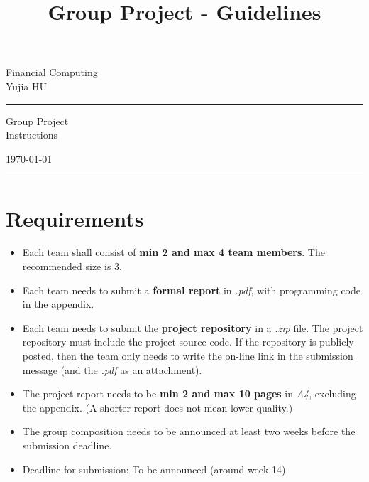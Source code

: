 \documentclass[a4paper,11pt]{article} %
\begin{document}

\title{Group Project - Guidelines} %
\fancyhead[C]{}
\begin{minipage}{0.295\textwidth} %
\raggedright
Financial Computing\\ %
\footnotesize %
Yujia HU %
\medskip\hrule
\end{minipage}
\begin{minipage}{0.4\textwidth} %
\centering 
\large %
Group Project\\ %
\normalsize %
Instructions\\ %
\end{minipage}
\begin{minipage}{0.295\textwidth} %
\raggedleft
\today\\ %
\footnotesize %
\medskip\hrule
\end{minipage}

\vspace{1cm}
\section{\textbf{Requirements}}
\begin{itemize}
	\item Each team shall consist of \textbf{min 2 and max 4 team members}. The recommended size is 3.
	\item Each team needs to submit a \textbf{formal report} in \textsl{.pdf}, with programming code in the appendix. 
	\item Each team needs to submit the \textbf{project repository} in a \textsl{.zip} file. The project repository must include the project source code. If the repository is publicly posted, then the team only needs to write the on-line link in the submission message (and the \textsl{.pdf} as an attachment).
	\item The project report needs to be \textbf{min 2 and max 10 pages} in \textsl{A4}, excluding the appendix. (A shorter report does not mean lower quality.)
	\item The group composition needs to be announced at least two weeks before the submission deadline.
	\item Deadline for submission: To be announced (around week 14)
\end{itemize}	
\end{document}
